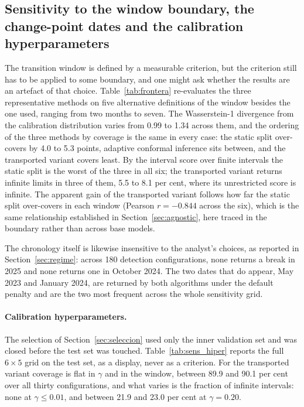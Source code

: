 \documentclass[preprint,3p,times]{elsarticle}
\begin{document}
\subsection{Sensitivity to the window boundary, the change-point dates and the calibration hyperparameters}
\label{sec:frontera}

The transition window is defined by a measurable criterion, but the criterion still has to be applied to some boundary, and one might ask whether the results are an artefact of that choice. Table~\ref{tab:frontera} re-evaluates the three representative methods on five alternative definitions of the window besides the one used, ranging from two months to seven. The Wasserstein-1 divergence from the calibration distribution varies from 0.99 to 1.34 across them, and the ordering of the three methods by coverage is the same in every case: the static split over-covers by 4.0 to 5.3 points, adaptive conformal inference sits between, and the transported variant covers least. By the interval score over finite intervals the static split is the worst of the three in all six; the transported variant returns infinite limits in three of them, 5.5 to 8.1 per cent, where its unrestricted score is infinite. The apparent gain of the transported variant follows how far the static split over-covers in each window (Pearson $r=-0.844$ across the six), which is the same relationship established in Section~\ref{sec:agnostic}, here traced in the boundary rather than across base models.



The chronology itself is likewise insensitive to the analyst's choices, as reported in Section~\ref{sec:regime}: across 180 detection configurations, none returns a break in 2025 and none returns one in October 2024. The two dates that do appear, May 2023 and January 2024, are returned by both algorithms under the default penalty and are the two most frequent across the whole sensitivity grid.

\paragraph{Calibration hyperparameters.} The selection of Section~\ref{sec:seleccion} used only the inner validation set and was closed before the test set was touched. Table~\ref{tab:sens_hiper} reports the full $6\times5$ grid on the test set, as a display, never as a criterion. For the transported variant coverage is flat in $\gamma$ and in the window, between 89.9 and 90.1 per cent over all thirty configurations, and what varies is the fraction of infinite intervals: none at $\gamma\le 0.01$, and between 21.9 and 23.0 per cent at $\gamma=0.20$.
\end{document}
